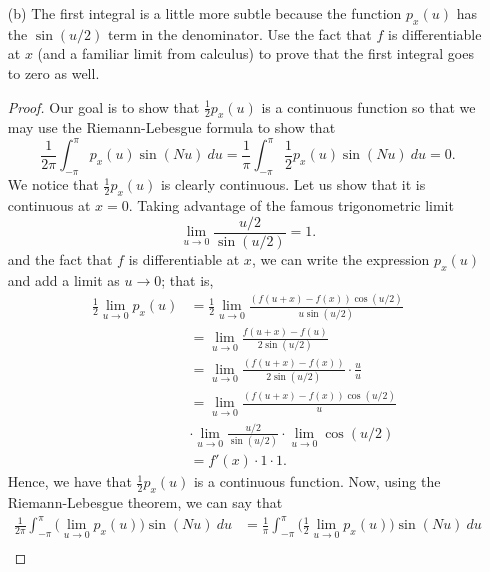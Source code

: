 \begin{enumerate}
\begin{proof}
        \end{proof} 
    \item[(b)] The first integral is a little more subtle because the function \( p_{x}(u)  \) has the \( \sin(u/2)  \) term in the denominator. Use the fact that \( f \) is differentiable at \( x  \) (and a familiar limit from calculus) to prove that the first integral goes to zero as well.
        \begin{proof}
            Our goal is to show that \(  \frac{ 1 }{ 2 } p_{x}(u)   \) is a continuous function so that we may use the Riemann-Lebesgue formula to show that 
            \[  \frac{ 1 }{ 2 \pi  } \int_{ -\pi  }^{ \pi  } p_{x}(u) \sin(Nu)   \ du = \frac{ 1 }{ \pi  } \int_{ -\pi  }^{ \pi  } \frac{ 1 }{ 2 } p_{x}(u) \sin(Nu) \ du = 0. \] We notice that \( \frac{ 1 }{ 2 } p_{x}(u)  \)  is clearly continuous. Let us show that it is continuous at \( x = 0  \).
        Taking advantage of the famous trigonometric limit 
        \[   \lim_{ u \to 0  } \frac{ u /2  }{ \sin(u/2) } = 1. \] and the fact that \( f  \) is differentiable at \( x  \), we can write the expression \( p_{x}(u)  \) and add a limit as \( u \to 0  \); that is, 
        \begin{align*}
            \frac{ 1 }{ 2 } \lim_{ u \to 0 } p_{x}(u) &= \frac{ 1 }{ 2 } \lim_{ u  \to 0 }   \frac{ (f(u+x) - f(x)) \cos(u/2)  }{ u \sin(u/2) } \\
                                                      &= \lim_{ u \to 0  } \frac{ f(u+x) - f(u)  }{ 2\sin(u/2) }  \\
                                         &= \lim_{ u \to 0  } \frac{ (f(u+x) - f(x))   }{ 2\sin(u/2) }  \cdot \frac{ u  }{ u  } \\
                                         &= \lim_{ u  \to 0 }  \frac{ (f(u+x)  - f(x) ) \cos(u/2)   }{ u  }  \\ 
                                         &\cdot \lim_{ u \to 0 } \frac{ u / 2  }{ \sin(u/2) } \cdot \lim_{ u \to 0 } \cos(u/2) \\
                                         &= f'(x) \cdot 1 \cdot 1.
        \end{align*}
        Hence, we have that \( \frac{ 1 }{ 2 }  p_{x}(u)  \) is a continuous function. Now, using the Riemann-Lebesgue theorem, we can say that  
        \begin{align*}
            \frac{ 1 }{ 2 \pi  }  \int_{ -\pi  }^{ \pi  } \Big(  \lim_{ u \to 0  }  p_{x}(u)  \Big)  \sin(Nu) \ du &= \frac{ 1 }{ \pi  }  \int_{ -\pi  }^{ \pi  } \Big( \frac{ 1 }{ 2 } \lim_{ u \to 0 } p_{x}(u) \Big) \sin(Nu)   \ du  \\

\end{align*}
\end{proof}
\end{enumerate}
